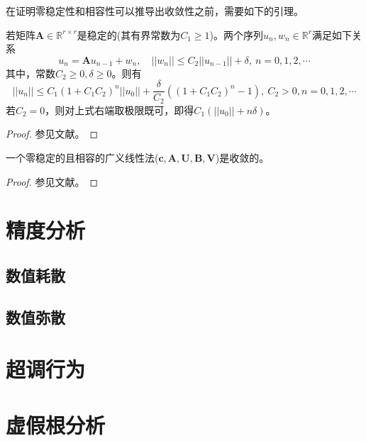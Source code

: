 在证明零稳定性和相容性可以推导出收敛性之前，需要如下的引理。
\begin{lemma}
若矩阵$\bm{A}\in\mathbb{R}^{r\times r}$是稳定的(其有界常数为$C_1\ge1$)。两个序列$u_n,w_n\in\mathbb{R}^r$满足如下关系
\begin{equation}
u_n=\bm{A}u_{n-1}+w_n,\quad ||w_n||\le C_2||u_{n-1}||+\delta,\ n=0,1,2,\cdots
\end{equation}
其中，常数$C_2\ge0,\delta\ge0$。则有
\begin{equation}
||u_n||\le C_1(1+C_1C_2)^n||u_0||+\frac{\delta}{C_2}\left((1+C_1C_2)^n-1\right),\ C_2>0,n=0,1,2,\cdots
\end{equation}
若$C_2=0$，则对上式右端取极限既可，即得$C_1(||u_0||+n\delta)$。
\end{lemma}
\begin{proof}
参见文献。
\end{proof}

\begin{theorem}
一个零稳定的且相容的广义线性法($\bm{c},\bm{A},\bm{U},\bm{B},\bm{V}$)是收敛的。
\end{theorem}
\begin{proof}
参见文献。
\end{proof}










\section{精度分析}

\subsection{数值耗散}

\subsection{数值弥散}

\section{超调行为}

\section{虚假根分析}

